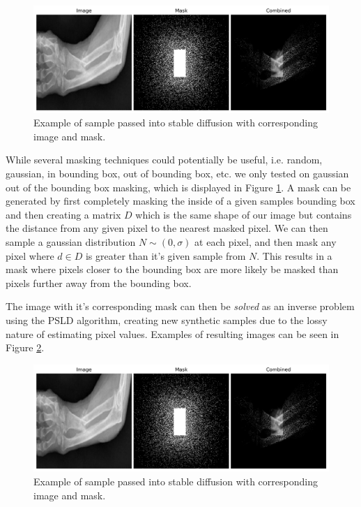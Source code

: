 \documentclass{article}
\begin{document}
\begin{figure}[ht]
    \vskip -0.1in
    \begin{center}
        \centerline{\includegraphics[width=\columnwidth]{Mask.png}}
        \caption{Example of sample passed into stable diffusion with corresponding image and mask.}
        \label{psld_mask}
    \end{center}
    \vskip -0.3in
\end{figure}

While several masking techniques could potentially be useful, i.e. random, gaussian, in bounding box, out of bounding box, etc. we only tested on
gaussian out of the bounding box masking, which is displayed in Figure \ref{psld_mask}. A mask can be generated by first completely masking the inside 
of a given samples bounding box and then creating 
a matrix $D$ which is the same shape of our image but contains the distance from any given pixel to the nearest masked pixel. We can then sample a gaussian
distribution $N \sim (0, \sigma)$ at each pixel, and then mask any pixel where $d \in D$ is greater than it's given sample from $N$. This results in a mask where pixels
closer to the bounding box are more likely be masked than pixels further away from the bounding box. 

The image with it's corresponding mask can then be \textit{solved} as an inverse problem using the PSLD algorithm, creating new synthetic samples due to the lossy nature
of estimating pixel values. Examples of resulting images can be seen in Figure \ref{psld_results}.

\begin{figure}[ht]
    \vskip -0.1in
    \begin{center}
        \centerline{\includegraphics[width=\columnwidth]{Mask.png}}
        \caption{Example of sample passed into stable diffusion with corresponding image and mask.}
        \label{psld_results}
    \end{center}
    \vskip -0.3in
\end{figure}
\end{document}
